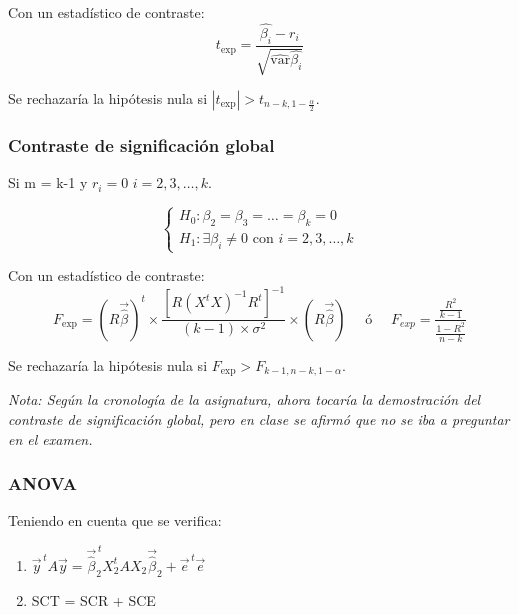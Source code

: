 \documentclass[a4paper,12pt]{article}
\newcommand{\ecuacion}[1]{\ensuremath{#1}}
\begin{document}
Con un estadístico de contraste:
\begin{equation}
    t_{\text{exp}} = \frac{\hat{\beta_i} - r_i}{\sqrt{\hat{\text{var}}\hat{\beta_i}}} 
\end{equation}

Se rechazaría la hipótesis nula si \ecuacion{|t_{\text{exp}}| > t_{n-k,1-\frac{\alpha}{2}}}.

\subsubsection*{Contraste de significación global}

Si m = k-1 y $r_i = 0 \,\, i=2, 3, \ldots , k.$

\begin{equation}
    \begin{cases}
        H_0: \beta_2 = \beta_3 = \ldots = \beta_k = 0 \\
        H_1: \exists \beta_i \neq 0 \text{ con } i = 2, 3, \ldots, k
    \end{cases}
\end{equation}

Con un estadístico de contraste:
\begin{equation}
    F_{\text{exp}} = (R\vec{\hat{\beta}})^t \times \frac{[R(X^tX)^{-1}R^t]^{-1}}{(k-1)\times \sigma^2} \times (R\vec{\hat{\beta}}) \quad \text{  ó } \quad F_{exp }= \frac{\frac{R^2}{k-1}}{\frac{1-R^2}{n-k}}
\end{equation}

Se rechazaría la hipótesis nula si \ecuacion{F_{\text{exp}} > F_{k-1,n-k,1-\alpha}}.

\begin{tcolorbox}[colback=red!5!white,colframe=red!75!black]
    \textit{Nota: Según la cronología de la asignatura, ahora tocaría la demostración del contraste de significación global, pero en clase se afirmó que no se iba a preguntar en el examen.}
\end{tcolorbox}


\subsubsection*{ANOVA}

Teniendo en cuenta que se verifica:
\begin{enumerate}
    \item $\vec{y}^{\,t}A\vec{y} = \vec{\hat{\beta}}_2^{\,t}X_2^tAX_2\vec{\hat{\beta}}_2+\vec{e}^{\,t}\vec{e}$
    \item SCT = SCR + SCE
\end{enumerate}
\end{document}
